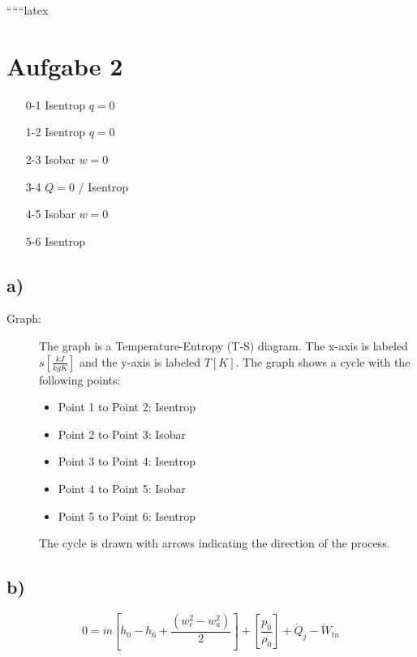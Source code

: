 
``````latex


\section*{Aufgabe 2}

\begin{itemize}
    \item[0-1] Isentrop \hspace{1cm} $q = 0$
    \item[1-2] Isentrop \hspace{1cm} $q = 0$
    \item[2-3] Isobar \hspace{1cm} $w = 0$
    \item[3-4] $Q = 0$ / Isentrop
    \item[4-5] Isobar \hspace{1cm} $w = 0$
    \item[5-6] Isentrop
\end{itemize}

\subsection*{a)}

\begin{description}
    \item[Graph:] The graph is a Temperature-Entropy (T-S) diagram. The x-axis is labeled $s \left[ \frac{kJ}{kgK} \right]$ and the y-axis is labeled $T \left[ K \right]$. The graph shows a cycle with the following points:
    \begin{itemize}
        \item Point 1 to Point 2: Isentrop
        \item Point 2 to Point 3: Isobar
        \item Point 3 to Point 4: Isentrop
        \item Point 4 to Point 5: Isobar
        \item Point 5 to Point 6: Isentrop
    \end{itemize}
    The cycle is drawn with arrows indicating the direction of the process.
\end{description}

\subsection*{b)}

\[
0 = \dot{m} \left[ h_0 - h_6 + \frac{(w_e^2 - w_a^2)}{2} \right] + \left[ \frac{p_0}{\rho_0} \right] + \dot{Q}_j - \dot{W}_{tn}
\]

